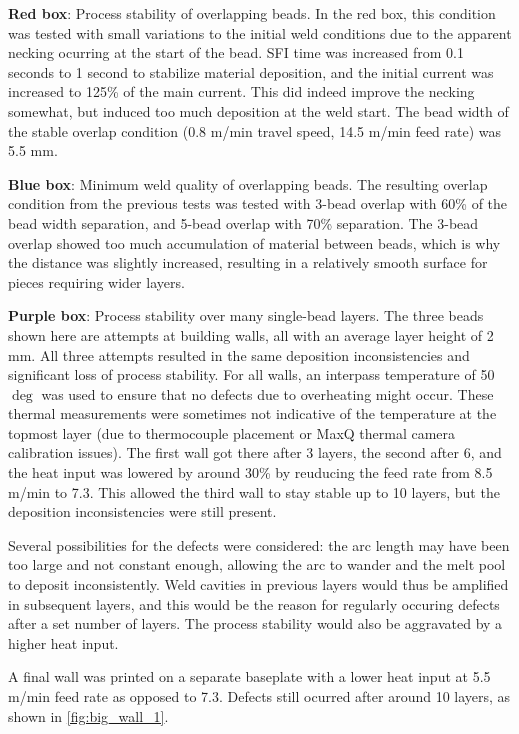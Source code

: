 \textbf{Red box}: Process stability of overlapping beads.
In the red box, this condition was tested with small variations to the initial weld conditions due to the apparent necking ocurring at the start of the bead. SFI time was increased from 0.1 seconds to 1 second to stabilize material deposition, and the initial current was increased to 125\% of the main current.
This did indeed improve the necking somewhat, but induced too much deposition at the weld start. The bead width of the stable overlap condition (0.8 m/min travel speed, 14.5 m/min feed rate) was 5.5 mm.

\textbf{Blue box}: Minimum weld quality of overlapping beads.
The resulting overlap condition from the previous tests was tested with 3-bead overlap with 60\% of the bead width separation, and 5-bead overlap with 70\% separation. The 3-bead overlap showed too much accumulation of material between beads, which is why the distance was slightly increased, resulting in a relatively smooth surface for pieces requiring wider layers.

\textbf{Purple box}: Process stability over many single-bead layers. The three beads shown here are attempts at building walls, all with an average layer height of 2 mm. All three attempts resulted in the same deposition inconsistencies and significant loss of process stability.
For all walls, an interpass temperature of 50$\deg$ was used to ensure that no defects due to overheating might occur. These thermal measurements were sometimes not indicative of the temperature at the topmost layer (due to thermocouple placement or MaxQ thermal camera calibration issues).
The first wall got there after 3 layers, the second after 6, and the heat input was lowered by around 30\% by reuducing the feed rate from 8.5 m/min to 7.3. This allowed the third wall to stay stable up to 10 layers, but the deposition inconsistencies were still present.

Several possibilities for the defects were considered: the arc length may have been too large and not constant enough, allowing the arc to wander and the melt pool to deposit inconsistently. Weld cavities in previous layers would thus be amplified in subsequent layers, and this would be the reason for regularly occuring defects after a set number of layers. The process stability would also be aggravated by a higher heat input.

A final wall was printed on a separate baseplate with a lower heat input at 5.5 m/min feed rate as opposed to 7.3. Defects still ocurred after around 10 layers, as shown in \autoref{fig:big_wall_1}.

